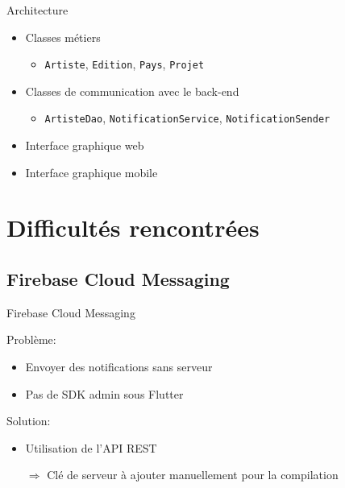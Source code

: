 \documentclass{beamer}
\begin{document}
\begin{frame}{Architecture}

\begin{itemize}
    \item Classes métiers
    \begin{itemize}
        \item \texttt{Artiste}, \texttt{Edition}, \texttt{Pays}, \texttt{Projet}
    \end{itemize}
    \item Classes de communication avec le back-end
    \begin{itemize}
        \item \texttt{ArtisteDao}, \texttt{NotificationService},
        \texttt{NotificationSender}
    \end{itemize}
    \item Interface graphique web
    \item Interface graphique mobile
\end{itemize}

\end{frame}

\section{Difficultés rencontrées}

\subsection{Firebase Cloud Messaging}

\begin{frame}{Firebase Cloud Messaging}

Problème:

\begin{itemize}
    \item Envoyer des notifications sans serveur
    \item Pas de SDK admin sous Flutter
\end{itemize}

Solution:

\begin{itemize}
    \item Utilisation de l'API REST
    \item[$\Rightarrow$] Clé de serveur à ajouter manuellement pour la
    compilation 
\end{itemize}

\end{frame}
\end{document}

